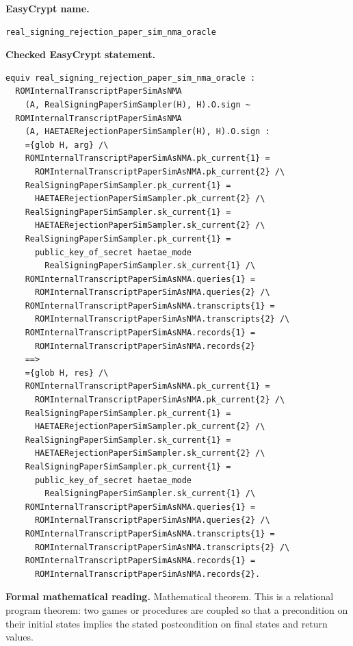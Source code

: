 \begin{formaltheorem}
\noindent\textbf{EasyCrypt name.}
\begin{lstlisting}[language=EasyCrypt,basicstyle=\ttfamily\scriptsize]
real_signing_rejection_paper_sim_nma_oracle
\end{lstlisting}
\noindent\textbf{Checked EasyCrypt statement.}
\begin{lstlisting}[language=EasyCrypt,basicstyle=\ttfamily\scriptsize]
equiv real_signing_rejection_paper_sim_nma_oracle :
  ROMInternalTranscriptPaperSimAsNMA
    (A, RealSigningPaperSimSampler(H), H).O.sign ~
  ROMInternalTranscriptPaperSimAsNMA
    (A, HAETAERejectionPaperSimSampler(H), H).O.sign :
    ={glob H, arg} /\
    ROMInternalTranscriptPaperSimAsNMA.pk_current{1} =
      ROMInternalTranscriptPaperSimAsNMA.pk_current{2} /\
    RealSigningPaperSimSampler.pk_current{1} =
      HAETAERejectionPaperSimSampler.pk_current{2} /\
    RealSigningPaperSimSampler.sk_current{1} =
      HAETAERejectionPaperSimSampler.sk_current{2} /\
    RealSigningPaperSimSampler.pk_current{1} =
      public_key_of_secret haetae_mode
        RealSigningPaperSimSampler.sk_current{1} /\
    ROMInternalTranscriptPaperSimAsNMA.queries{1} =
      ROMInternalTranscriptPaperSimAsNMA.queries{2} /\
    ROMInternalTranscriptPaperSimAsNMA.transcripts{1} =
      ROMInternalTranscriptPaperSimAsNMA.transcripts{2} /\
    ROMInternalTranscriptPaperSimAsNMA.records{1} =
      ROMInternalTranscriptPaperSimAsNMA.records{2}
    ==>
    ={glob H, res} /\
    ROMInternalTranscriptPaperSimAsNMA.pk_current{1} =
      ROMInternalTranscriptPaperSimAsNMA.pk_current{2} /\
    RealSigningPaperSimSampler.pk_current{1} =
      HAETAERejectionPaperSimSampler.pk_current{2} /\
    RealSigningPaperSimSampler.sk_current{1} =
      HAETAERejectionPaperSimSampler.sk_current{2} /\
    RealSigningPaperSimSampler.pk_current{1} =
      public_key_of_secret haetae_mode
        RealSigningPaperSimSampler.sk_current{1} /\
    ROMInternalTranscriptPaperSimAsNMA.queries{1} =
      ROMInternalTranscriptPaperSimAsNMA.queries{2} /\
    ROMInternalTranscriptPaperSimAsNMA.transcripts{1} =
      ROMInternalTranscriptPaperSimAsNMA.transcripts{2} /\
    ROMInternalTranscriptPaperSimAsNMA.records{1} =
      ROMInternalTranscriptPaperSimAsNMA.records{2}.
\end{lstlisting}
\noindent\textbf{Formal mathematical reading.}
Mathematical theorem. This is a relational program theorem: two games or procedures are coupled so that a precondition on their initial states implies the stated postcondition on final states and return values.


\end{formaltheorem}
